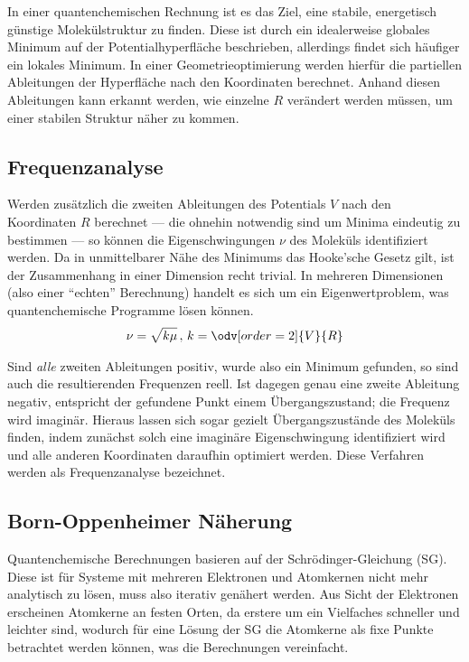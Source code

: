 In einer quantenchemischen Rechnung ist es das Ziel, eine stabile, energetisch günstige Molekülstruktur zu finden.
Diese ist durch ein idealerweise globales Minimum auf der Potentialhyperfläche beschrieben, allerdings findet sich häufiger ein lokales Minimum.
In einer Geometrieoptimierung werden hierfür die partiellen Ableitungen der Hyperfläche nach den Koordinaten berechnet.
Anhand diesen Ableitungen kann erkannt werden, wie einzelne $R$ verändert werden müssen, um einer stabilen Struktur näher zu kommen.

\subsection{Frequenzanalyse}

Werden zusätzlich die zweiten Ableitungen des Potentials $V$ nach den  Koordinaten $R$ berechnet --- die ohnehin notwendig sind um Minima eindeutig zu bestimmen --- so können die Eigenschwingungen $\nu$ des Moleküls identifiziert werden.
Da in unmittelbarer Nähe des Minimums das Hooke'sche Gesetz gilt, ist der Zusammenhang in einer Dimension recht trivial. 
In mehreren Dimensionen (also einer \enquote{echten} Berechnung) handelt es sich um ein Eigenwertproblem, was quantenchemische Programme lösen können.
\begin{align}
    \nu = \sqrt{k\mu} \,,\, k = \odv[order=2]{V}{R}
\end{align}

Sind \textit{alle} zweiten Ableitungen positiv, wurde also ein Minimum gefunden, so sind auch die resultierenden Frequenzen reell.
Ist dagegen genau eine zweite Ableitung negativ, entspricht der gefundene Punkt einem Übergangszustand; die Frequenz wird imaginär.
Hieraus lassen sich sogar gezielt Übergangszustände des Moleküls finden, indem zunächst solch eine imaginäre Eigenschwingung identifiziert wird und alle anderen Koordinaten daraufhin optimiert werden.
Diese Verfahren werden als Frequenzanalyse bezeichnet.

\subsection{Born-Oppenheimer Näherung}

Quantenchemische Berechnungen basieren auf der Schrödinger-Gleichung (SG).
Diese ist für Systeme mit mehreren Elektronen und Atomkernen nicht mehr analytisch zu lösen, muss also iterativ genähert werden.
Aus Sicht der Elektronen erscheinen Atomkerne an festen Orten, da erstere um ein Vielfaches schneller und leichter sind,
wodurch für eine Lösung der SG die Atomkerne als fixe Punkte betrachtet werden können, was die Berechnungen vereinfacht.

